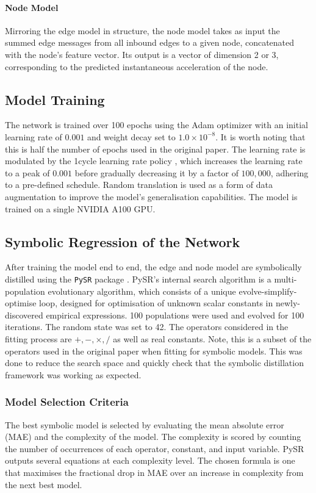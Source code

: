\documentclass[11pt]{article}
\begin{document}
\paragraph*{Node Model} Mirroring the edge model in structure, the node model takes as input the summed edge messages from all inbound edges to a given node, concatenated with the node's feature vector. Its output is a vector of dimension 2 or 3, corresponding to the predicted instantaneous acceleration of the node.

\subsection{Model Training}
The network is trained over 100 epochs using the Adam optimizer with an initial learning rate of \(0.001\) and weight decay set to \(1.0 \times 10^{-8}\). It is worth noting that this is half the number of epochs used in the original paper. The learning rate is modulated by the 1cycle learning rate policy \cite{smith2018superconvergence}, which increases the learning rate to a peak of \(0.001\) before gradually decreasing it by a factor of \(100,000\), adhering to a pre-defined schedule. Random translation is used as a form of data augmentation to improve the model's generalisation capabilities. The model is trained on a single NVIDIA A100 GPU.

\subsection{Symbolic Regression of the Network}
After training the model end to end, the edge and node model are symbolically distilled using the \texttt{PySR} package \cite{cranmer2023interpretable}. PySR's internal search algorithm is a multi-population evolutionary algorithm, which consists of a unique evolve-simplify-optimise loop, designed for optimisation of unknown scalar constants in newly-discovered empirical expressions. 100 populations were used and evolved for 100 iterations. The random state was set to 42. The operators considered in the fitting process are $ +, -, \times , /$ as well as real constants. Note, this is a subset of the operators used in the original paper when fitting for symbolic models. This was done to reduce the search space and quickly check that the symbolic distillation framework was working as expected.

\subsubsection{Model Selection Criteria}
The best symbolic model is selected by evaluating the mean absolute error (MAE) and the complexity of the model. The complexity is scored by counting the number of occurrences of each operator, constant, and input variable. PySR outputs several equations at each complexity level. The chosen formula is one that maximises the fractional drop in MAE over an increase in complexity from the next best model.
\end{document}
